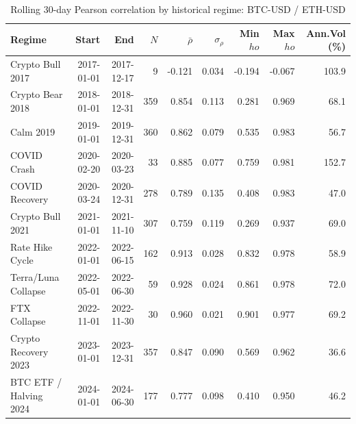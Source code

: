 \begin{table}[H]
\centering
\small
\caption{Rolling 30-day Pearson correlation by historical regime: BTC-USD / ETH-USD}
\label{tab:regime_corr_BTCUSDETHUSD}
\begin{tabular}{lrrrrrrrr}
\toprule
Regime & Start & End & $N$ & $\bar{\rho}$ & $\sigma_\rho$ & Min $
ho$ & Max $
ho$ & Ann.Vol (\%) \\
\midrule
Crypto Bull 2017 & 2017-01-01 & 2017-12-17 & 9 & -0.121 & 0.034 & -0.194 & -0.067 & 103.9 \\
Crypto Bear 2018 & 2018-01-01 & 2018-12-31 & 359 & 0.854 & 0.113 & 0.281 & 0.969 & 68.1 \\
Calm 2019 & 2019-01-01 & 2019-12-31 & 360 & 0.862 & 0.079 & 0.535 & 0.983 & 56.7 \\
COVID Crash & 2020-02-20 & 2020-03-23 & 33 & 0.885 & 0.077 & 0.759 & 0.981 & 152.7 \\
COVID Recovery & 2020-03-24 & 2020-12-31 & 278 & 0.789 & 0.135 & 0.408 & 0.983 & 47.0 \\
Crypto Bull 2021 & 2021-01-01 & 2021-11-10 & 307 & 0.759 & 0.119 & 0.269 & 0.937 & 69.0 \\
Rate Hike Cycle & 2022-01-01 & 2022-06-15 & 162 & 0.913 & 0.028 & 0.832 & 0.978 & 58.9 \\
Terra/Luna Collapse & 2022-05-01 & 2022-06-30 & 59 & 0.928 & 0.024 & 0.861 & 0.978 & 72.0 \\
FTX Collapse & 2022-11-01 & 2022-11-30 & 30 & 0.960 & 0.021 & 0.901 & 0.977 & 69.2 \\
Crypto Recovery 2023 & 2023-01-01 & 2023-12-31 & 357 & 0.847 & 0.090 & 0.569 & 0.962 & 36.6 \\
BTC ETF / Halving 2024 & 2024-01-01 & 2024-06-30 & 177 & 0.777 & 0.098 & 0.410 & 0.950 & 46.2 \\
\bottomrule
\end{tabular}
\end{table}
